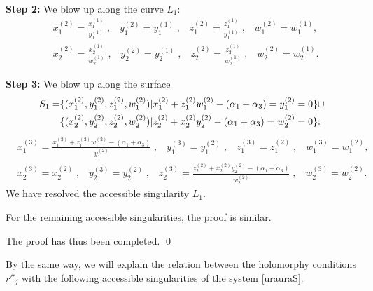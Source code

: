 {\bf Step 2:} We blow up along the curve $L_1${\rm : \rm}
\begin{align*}
&{x_{1}^{(2)}}=\frac{x_{1}^{(1)}}{y_{1}^{(1)}} \;, \;\;\; {y_{1}^{(2)}}=y_{1}^{(1)} \;, \;\;\; {z_{1}^{(2)}}=\frac{z_{1}^{(1)}}{y_{1}^{(1)}} \;, \;\;\; {w_{1}^{(2)}}=w_{1}^{(1)},\\
&{x_{2}^{(2)}}=\frac{x_{2}^{(1)}}{w_{2}^{(1)}} \;, \;\;\; {y_{2}^{(2)}}=y_{2}^{(1)} \;, \;\;\; {z_{2}^{(2)}}=\frac{z_{2}^{(1)}}{w_{2}^{(1)}} \;, \;\;\; {w_{2}^{(2)}}=w_{2}^{(1)}.
\end{align*}

{\bf Step 3:} We blow up along the surface
\begin{align*}
S_1=&\{(x_{1}^{(2)},y_{1}^{(2)},z_{1}^{(2)},w_{1}^{(2)})|x_{1}^{(2)}+z_{1}^{(2)}w_{1}^{(2)}-(\alpha_1+\alpha_3)=y_{1}^{(2)}=0 \} \cup\\
&\{(x_{2}^{(2)},y_{2}^{(2)},z_{2}^{(2)},w_{2}^{(2)})|z_{2}^{(2)}+x_{2}^{(2)}y_{2}^{(2)}-(\alpha_1+\alpha_3)=w_{2}^{(2)}=0 \}{\rm : \rm}
\end{align*}
\begin{align*}
&{x_{1}^{(3)}}=\frac{x_{1}^{(2)}+z_{1}^{(2)}w_{1}^{(2)}-(\alpha_1+\alpha_3)}{y_{1}^{(2)}} \;, \;\;\; {y_{1}^{(3)}}=y_{1}^{(2)} \;, \;\;\; {z_{1}^{(3)}}=z_{1}^{(2)} \;, \;\;\; {w_{1}^{(3)}}=w_{1}^{(2)},\\
&{x_{2}^{(3)}}=x_{2}^{(2)} \;, \;\;\; {y_{2}^{(3)}}=y_{2}^{(2)} \;, \;\;\; {z_{2}^{(3)}}=\frac{z_{2}^{(2)}+x_{2}^{(2)}y_{2}^{(2)}-(\alpha_1+\alpha_3)}{w_{2}^{(2)}} \;, \;\;\; {w_{2}^{(3)}}=w_{2}^{(2)}.
\end{align*}
We have resolved the accessible singularity $L_1$.

For the remaining accessible singularities, the proof is similar.

The proof has thus been completed.   \qed

By the same way, we will explain the relation between the holomorphy conditions $r''_j$ with the following accessible singularities of the system \eqref{urauraS}.



